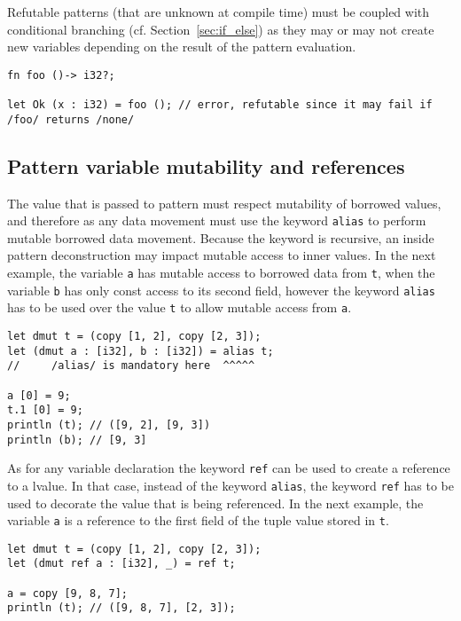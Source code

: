 Refutable patterns (that are unknown at compile time) must be coupled with
conditional branching (cf. Section~\ref{sec:if_else}) as they may or may not
create new variables depending on the result of the pattern evaluation.

\begin{lstlisting}[style=coloredverbatim]
fn foo ()-> i32?;

let Ok (x : i32) = foo (); // error, refutable since it may fail if /foo/ returns /none/
\end{lstlisting}

\subsection{Pattern variable mutability and references}

The value that is passed to pattern must respect mutability of borrowed values,
and therefore as any data movement must use the keyword \texttt{alias} to
perform mutable borrowed data movement. Because the keyword is recursive, an
inside pattern deconstruction may impact mutable access to inner values. In the
next example, the variable \texttt{a} has mutable access to borrowed data from
\texttt{t}, when the variable \texttt{b} has only const access to its second
field, however the keyword \texttt{alias} has to be used over the value
\texttt{t} to allow mutable access from \texttt{a}.

\begin{lstlisting}[style=coloredverbatim]
let dmut t = (copy [1, 2], copy [2, 3]);
let (dmut a : [i32], b : [i32]) = alias t;
//     /alias/ is mandatory here  ^^^^^

a [0] = 9;
t.1 [0] = 9;
println (t); // ([9, 2], [9, 3])
println (b); // [9, 3]
\end{lstlisting}

As for any variable declaration the keyword \texttt{ref} can be used to create a
reference to a lvalue. In that case, instead of the keyword \texttt{alias}, the
keyword \texttt{ref} has to be used to decorate the value that is being
referenced. In the next example, the variable \texttt{a} is a reference to the
first field of the tuple value stored in \texttt{t}.

\begin{lstlisting}[style=coloredverbatim]
let dmut t = (copy [1, 2], copy [2, 3]);
let (dmut ref a : [i32], _) = ref t;

a = copy [9, 8, 7];
println (t); // ([9, 8, 7], [2, 3]);
\end{lstlisting}

